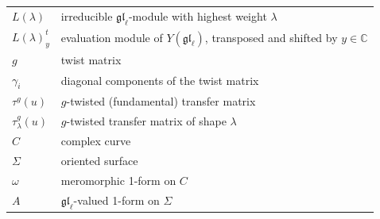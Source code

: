 \documentclass[11pt]{report}
\theoremstyle{definition}
\theoremstyle{remark}
\theoremstyle{remark}
\newcommand{\C}{\mathbb{C}}
\begin{document}
\begin{tabular}{l|l}
$L(\lambda)$ & irreducible $\mathfrak{gl}_\ell$-module with highest weight $\lambda$ \\
$L(\lambda)_y^t$ & evaluation module of $Y(\mathfrak{gl}_\ell)$, transposed and shifted by $y \in \C$ \\
$g$ & twist matrix \\
$\gamma_i$ & diagonal components of the twist matrix \\
$\tau^g(u)$ & $g$-twisted (fundamental) transfer matrix \\
$\tau_\lambda^g(u)$ & $g$-twisted transfer matrix of shape $\lambda$ \\
$C$ & complex curve \\
$\Sigma$ & oriented surface \\
$\omega$ & meromorphic 1-form on $C$ \\
$A$ & $\mathfrak{gl}_\ell$-valued 1-form on $\Sigma$
\end{tabular}

\pagebreak

\printindex




%
%

\end{document}
